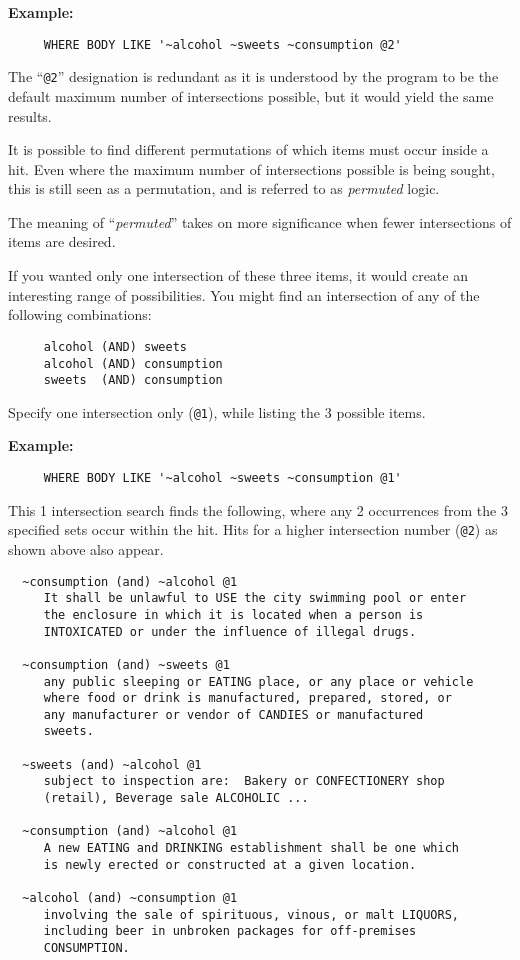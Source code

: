 {\bf Example:}
\begin{verbatim}
     WHERE BODY LIKE '~alcohol ~sweets ~consumption @2'
\end{verbatim}

The ``\verb`@2`'' designation is redundant as it is understood by the
program to be the default maximum number of intersections possible,
but it would yield the same results.

It is possible to find different permutations of which items must
occur inside a hit.  Even where the maximum number of intersections
possible is being sought, this is still seen as a permutation, and is
referred to as {\em permuted} logic.

The meaning of ``{\em permuted}'' takes on more significance when
fewer intersections of items are desired.

If you wanted only one intersection of these three items, it would
create an interesting range of possibilities.  You might find an
intersection of any of the following combinations:

\begin{verbatim}
     alcohol (AND) sweets
     alcohol (AND) consumption
     sweets  (AND) consumption
\end{verbatim}

Specify one intersection only (\verb`@1`), while listing the 3
possible items.

{\bf Example:}
\begin{verbatim}
     WHERE BODY LIKE '~alcohol ~sweets ~consumption @1'
\end{verbatim}

This 1 intersection search finds the following, where any 2
occurrences from the 3 specified sets occur within the hit.  Hits for
a higher intersection number (\verb`@2`) as shown above also appear.

\begin{verbatim}
  ~consumption (and) ~alcohol @1
     It shall be unlawful to USE the city swimming pool or enter
     the enclosure in which it is located when a person is
     INTOXICATED or under the influence of illegal drugs.

  ~consumption (and) ~sweets @1
     any public sleeping or EATING place, or any place or vehicle
     where food or drink is manufactured, prepared, stored, or
     any manufacturer or vendor of CANDIES or manufactured
     sweets.

  ~sweets (and) ~alcohol @1
     subject to inspection are:  Bakery or CONFECTIONERY shop
     (retail), Beverage sale ALCOHOLIC ...

  ~consumption (and) ~alcohol @1
     A new EATING and DRINKING establishment shall be one which
     is newly erected or constructed at a given location.

  ~alcohol (and) ~consumption @1
     involving the sale of spirituous, vinous, or malt LIQUORS,
     including beer in unbroken packages for off-premises
     CONSUMPTION.
\end{verbatim}

